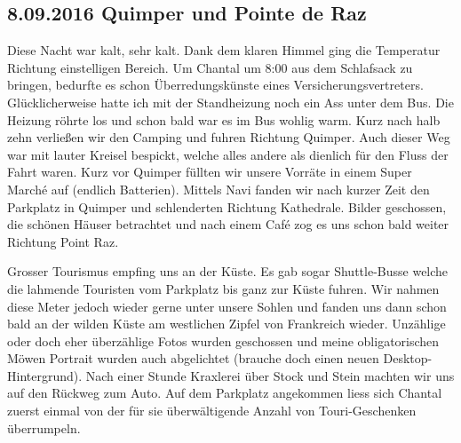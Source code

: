 \subsection{8.09.2016 Quimper und Pointe de Raz}
Diese Nacht war kalt, sehr kalt.
Dank dem klaren Himmel ging die Temperatur Richtung einstelligen Bereich.
Um Chantal um 8:00 aus dem Schlafsack zu bringen, bedurfte es schon Überredungskünste eines Versicherungsvertreters.
Glücklicherweise hatte ich mit der Standheizung noch ein Ass unter dem Bus.
Die Heizung röhrte los und schon bald war es im Bus wohlig warm.
Kurz nach halb zehn verließen wir den Camping und fuhren Richtung Quimper.
Auch dieser Weg war mit lauter Kreisel bespickt, welche alles andere als dienlich für den Fluss der Fahrt waren.
Kurz vor Quimper füllten wir unsere Vorräte in einem Super Marché auf (endlich Batterien).
Mittels Navi fanden wir nach kurzer Zeit den Parkplatz in Quimper und schlenderten Richtung Kathedrale.
Bilder geschossen, die schönen Häuser betrachtet und nach einem Café zog es uns schon bald weiter Richtung Point Raz.

Grosser Tourismus empfing uns an der Küste.
Es gab sogar Shuttle-Busse welche die lahmende Touristen vom Parkplatz bis ganz zur Küste fuhren.
Wir nahmen diese Meter jedoch wieder gerne unter unsere Sohlen und fanden uns dann schon bald an der wilden Küste am westlichen Zipfel von Frankreich wieder.
Unzählige oder doch eher überzählige Fotos wurden geschossen und meine obligatorischen Möwen Portrait wurden auch abgelichtet (brauche doch einen neuen Desktop-Hintergrund).
Nach einer Stunde Kraxlerei über Stock und Stein machten wir uns auf den Rückweg zum Auto.
Auf dem Parkplatz angekommen liess sich Chantal zuerst einmal von der für sie überwältigende Anzahl von Touri-Geschenken überrumpeln.

